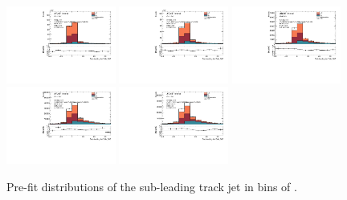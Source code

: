 \begin{figure}[htbp]
  \centering
 \includegraphics[width=0.32\textwidth]{figures/gbb/Sub_Sd0_Fits/Canv_PreFit_0-Zp_T-01_LpT_INF_SpT_INF_coarse_y.pdf}
 \includegraphics[width=0.32\textwidth]{figures/gbb/Sub_Sd0_Fits/Canv_PreFit_01-Zp_T-02_LpT_INF_SpT_INF_coarse_y.pdf}
 \includegraphics[width=0.32\textwidth]{figures/gbb/Sub_Sd0_Fits/Canv_PreFit_02-Zp_T-03_LpT_INF_SpT_INF_coarse_y.pdf}\\
 \includegraphics[width=0.32\textwidth]{figures/gbb/Sub_Sd0_Fits/Canv_PreFit_03-Zp_T-04_LpT_INF_SpT_INF_coarse_y.pdf}
 \includegraphics[width=0.32\textwidth]{figures/gbb/Sub_Sd0_Fits/Canv_PreFit_04-Zp_T-05_LpT_INF_SpT_INF_coarse_y.pdf}

\caption{Pre-fit \subsdzero distributions of the sub-leading track jet in bins of \zpt. }
  \label{fig:ZpT-prefits-subleading}
\end{figure}

